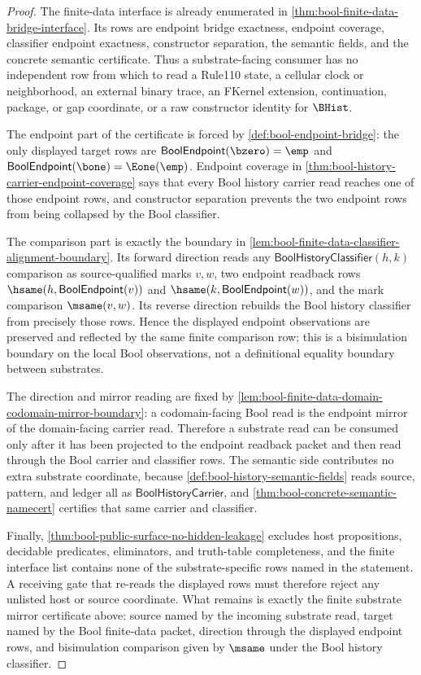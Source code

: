 \begin{proof}
The finite-data interface is already enumerated in
\autoref{thm:bool-finite-data-bridge-interface}. Its rows are endpoint bridge
exactness, endpoint coverage, classifier endpoint exactness, constructor
separation, the semantic fields, and the concrete semantic certificate. Thus a
substrate-facing consumer has no independent row from which to read a Rule110
state, a cellular clock or neighborhood, an external binary trace, an FKernel
extension, continuation, package, or gap coordinate, or a raw constructor
identity for $\BHist$.

The endpoint part of the certificate is forced by \autoref{def:bool-endpoint-bridge}:
the only displayed target rows are
$\mathsf{BoolEndpoint}(\bzero)=\emp$ and
$\mathsf{BoolEndpoint}(\bone)=\Eone(\emp)$. Endpoint coverage in
\autoref{thm:bool-history-carrier-endpoint-coverage} says that every Bool
history carrier read reaches one of those endpoint rows, and constructor
separation prevents the two endpoint rows from being collapsed by the Bool
classifier.

The comparison part is exactly the boundary in
\autoref{lem:bool-finite-data-classifier-alignment-boundary}. Its forward
direction reads any $\mathsf{BoolHistoryClassifier}(h,k)$ comparison as
source-qualified marks $v,w$, two endpoint readback rows
$\hsame(h,\mathsf{BoolEndpoint}(v))$ and
$\hsame(k,\mathsf{BoolEndpoint}(w))$, and the mark comparison $\msame(v,w)$.
Its reverse direction rebuilds the Bool history classifier from precisely
those rows. Hence the displayed endpoint observations are preserved and
reflected by the same finite comparison row; this is a bisimulation boundary on
the local Bool observations, not a definitional equality boundary between
substrates.

The direction and mirror reading are fixed by
\autoref{lem:bool-finite-data-domain-codomain-mirror-boundary}: a codomain-facing
Bool read is the endpoint mirror of the domain-facing carrier read. Therefore a
substrate read can be consumed only after it has been projected to the endpoint
readback packet and then read through the Bool carrier and classifier rows. The
semantic side contributes no extra substrate coordinate, because
\autoref{def:bool-history-semantic-fields} reads source, pattern, and ledger all
as $\mathsf{BoolHistoryCarrier}$, and
\autoref{thm:bool-concrete-semantic-namecert} certifies that same carrier and
classifier.

Finally, \autoref{thm:bool-public-surface-no-hidden-leakage} excludes host
propositions, decidable predicates, eliminators, and truth-table completeness,
and the finite interface list contains none of the substrate-specific rows
named in the statement. A receiving gate that re-reads the displayed rows must
therefore reject any unlisted host or source coordinate. What remains is exactly
the finite substrate mirror certificate above: source named by the incoming
substrate read, target named by the Bool finite-data packet, direction through
the displayed endpoint rows, and bisimulation comparison given by $\msame$ under
the Bool history classifier.
\end{proof}
